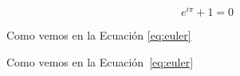 \documentclass[a4paper,11pt]{article}
\newcommand{\refeq}[1]{Ecuación~\ref{#1}}
\begin{document}
\begin{equation}
e^{i\pi} + 1 = 0
\label{eq:euler}
\end{equation}

Como vemos en la Ecuación \ref{eq:euler}

Como vemos en la \refeq{eq:euler}
\end{document}
